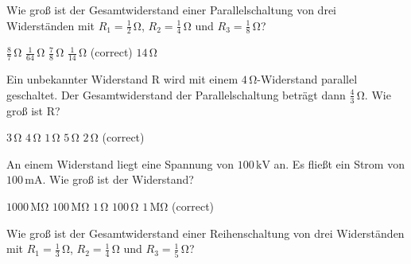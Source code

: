 \documentclass[11pt]{exam}
\begin{document}
\setlength{\voffset}{-0.5in}
\setlength{\headsep}{5pt}

\hspace{2mm}
 \hspace{5mm}
\vspace{4mm}

\begin{questions}

\question Wie groß ist der Gesamtwiderstand einer Parallelschaltung von drei Widerständen mit \(R_1=\mathrm{\frac{1}{2}\,\Omega}\), \(R_2=\mathrm{\frac{1}{4}\,\Omega}\) und \(R_3=\mathrm{\frac{1}{8}\,\Omega}\)?

\begin{choices}
	\choice \(\mathrm{\frac{8}{7}\,\Omega}\)
	\choice \(\mathrm{\frac{1}{64}\,\Omega}\)
	\choice \(\mathrm{\frac{7}{8}\,\Omega}\)
	\choice \(\mathrm{\frac{1}{14}\,\Omega}\) (correct)
	\choice \(\mathrm{14\,\Omega}\)
\end{choices}

\vspace{3mm}\question Ein unbekannter Widerstand \(\mathrm{R}\) wird mit einem \(\mathrm{4\,\Omega}\)-Widerstand parallel geschaltet. Der Gesamtwiderstand der Parallelschaltung beträgt dann \(\mathrm{\frac{4}{3}\,\Omega}\). Wie groß ist \(\mathrm{R}\)?

\begin{choices}
	\choice \(\mathrm{3\,\Omega}\)
	\choice \(\mathrm{4\,\Omega}\)
	\choice \(\mathrm{1\,\Omega}\)
	\choice \(\mathrm{5\,\Omega}\)
	\choice \(\mathrm{2\,\Omega}\) (correct)
\end{choices}

\vspace{3mm}\question An einem Widerstand liegt eine Spannung von \(\mathrm{100\,kV}\) an. Es fließt ein Strom von \(\mathrm{100\,mA}\). Wie groß ist der Widerstand?

\begin{choices}
	\choice \(\mathrm{1000\,M\Omega}\)
	\choice \(\mathrm{100\,M\Omega}\)
	\choice \(\mathrm{1\,\Omega}\)
	\choice \(\mathrm{100\,\Omega}\)
	\choice \(\mathrm{1\,M\Omega}\) (correct)
\end{choices}

\vspace{3mm}\question Wie groß ist der Gesamtwiderstand einer Reihenschaltung von drei Widerständen mit \(R_1=\mathrm{\frac{1}{3}\,\Omega}\), \(R_2=\mathrm{\frac{1}{4}\,\Omega}\) und \(R_3=\mathrm{\frac{1}{5}\,\Omega}\)?


\end{questions}
\end{document}
